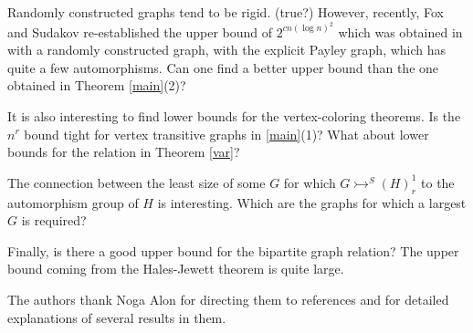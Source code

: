 \documentclass[11pt]{amsart}
\newcommand{\ars}{\rightarrowtail}
\begin{document}
Randomly constructed graphs tend to be rigid. (true?) However,
recently, Fox and Sudakov \cite{FS} re-established the upper bound of
$2^{cn(\log n)^2}$ which was obtained in \cite{KPR} with a randomly
constructed graph, with the explicit Payley graph, which has quite a
few automorphisms.  Can one find a better upper bound than the one
obtained in Theorem \ref{main}(2)?

It is also interesting to find lower bounds for the vertex-coloring
theorems. Is the $n^r$ bound tight for vertex transitive graphs in
\ref{main}(1)? What about lower bounds for the relation in Theorem
\ref{var}? 

The connection between the least size of some $G$ for which
$G\ars^S(H)^1_r$ to  the automorphism group of $H$ is
interesting. Which are the graphs for which a largest $G$ is required? 

Finally, is there a good upper bound for the bipartite graph relation?
The upper bound coming from the Hales-Jewett theorem is quite large.

\bigskip
The authors  thank Noga Alon for directing  them to references
\cite{ALR,B,BS,FS} and  for  detailed explanations of several  results in
them. 
\end{document}
